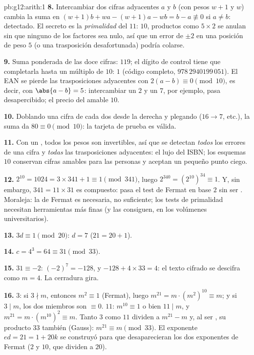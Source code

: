 \begin{solution}{pb:g12:arith:1}
\textbf{8.} Intercambiar dos cifras adyacentes $a$ y $b$ (con pesos
$w + 1$ y $w$) cambia la suma en
$(w+1)b + wa - (w+1)a - wb = b - a \not\equiv 0$ si $a \neq b$: detectado.
El secreto es la \emph{primalidad} del $11$:  $10$, productos como
$5 \times 2$ se anulan sin que ninguno de los factores sea nulo, así que un
error de $\pm 2$ en una posición de peso $5$ (o una trasposición
desafortunada) podría colarse.

\textbf{9.} Suma ponderada de las doce cifras: $119$; el dígito de control
tiene que completarla hasta un múltiplo de $10$: $1$ (código completo,
$978\,2940199\,051$). El EAN se pierde las trasposiciones adyacentes con
$2(a - b) \equiv 0 \pmod{10}$, es decir, con $\abs{a - b} = 5$:
intercambiar un $2$ y un $7$, por ejemplo, pasa desapercibido; el precio
del amable  $10$.

\textbf{10.} Doblando una cifra de cada dos desde la derecha y plegando
($16 \to 7$, etc.), la suma da $80 \equiv 0 \pmod{10}$: la tarjeta de
prueba es válida.

\textbf{11.} Con un  , todos los pesos son invertibles, así que
se detectan \emph{todos} los errores de una cifra y \emph{todas} las
trasposiciones adyacentes: el lujo del ISBN; los esquemas  $10$
conservan cifras amables para las personas y aceptan un pequeño punto
ciego.

\textbf{12.} $2^{10} = 1024 = 3 \times 341 + 1 \equiv 1 \pmod{341}$, luego
$2^{340} = \left(2^{10}\right)^{34} \equiv 1$. Y, sin embargo,
$341 = 11 \times 31$ es compuesto: pasa el test de Fermat en base $2$ sin
ser . Moraleja: la  de Fermat es necesaria, no suficiente;
los tests de primalidad necesitan herramientas más finas (y las consiguen,
en los volúmenes universitarios).

\textbf{13.} $3d \equiv 1 \pmod{20}$: $d = 7$ ($21 = 20 + 1$).

\textbf{14.} $c = 4^3 = 64 \equiv 31 \pmod{33}$.

\textbf{15.} $31 \equiv -2$: $(-2)^7 = -128$, y
$-128 + 4 \times 33 = 4$: el texto cifrado se descifra como $m = 4$. La
cerradura gira.

\textbf{16.}  $3$: si $3 \nmid m$, entonces $m^2 \equiv 1$ (Fermat),
luego $m^{21} = m \cdot \left(m^2\right)^{10} \equiv m$; y si $3 \mid m$,
los dos miembros son $\equiv 0$.  $11$: $m^{10} \equiv 1$ o bien
$11 \mid m$, y $m^{21} = m \cdot \left(m^{10}\right)^2 \equiv m$. Tanto
$3$ como $11$ dividen a $m^{21} - m$ y, al ser , su producto
$33$ también (Gauss): $m^{21} \equiv m \pmod{33}$. El exponente
$ed = 21 = 1 + 20k$ se construyó para que desaparecieran los dos exponentes
de Fermat ($2$ y $10$, que dividen a $20$).


\end{solution}
